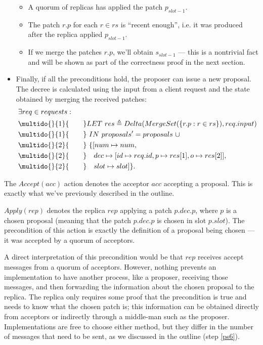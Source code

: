\documentclass[12pt,a4paper,en]{pracamgr}
\newcommand{\ind}[1]{\multido{}{#1}{\qquad}}
\begin{document}
\begin{itemize}
\begin{itemize}
            \item A quorum of replicas has applied the patch $p_{slot - 1}$.
            \item The patch $r.p$ for each $r \in rs$ is ``recent enough'', i.e. it was produced after the replica applied $p_{slot - 1}$.
            \item If we merge the patches $r.p$, we'll obtain $s_{slot - 1}$ --- this is a nontrivial fact and will be shown as part of the correctness proof in the next section.
        \end{itemize}
    \item Finally, if all the preconditions hold, the proposer can issue a new proposal. The decree is calculated using the input from a client request and the state obtained by merging the received patches:
        \begin{align*}
            & \exists req \in requests:\\
            & \ind{1} LET\ res \triangleq Delta(MergeSet(\{r.p: r \in rs\}), req.input)\\
            & \ind{1} \ IN\ proposals' = proposals\ \cup\\
            & \ind{2} \ \{[num \mapsto num,\\
            & \ind{2} \ \ \ dec \mapsto [id \mapsto req.id, p \mapsto res[1], o \mapsto res[2]],\\
            & \ind{2} \ \ \ slot \mapsto slot]\}.
        \end{align*}
\end{itemize}

The $Accept(acc)$ action denotes the acceptor $acc$ accepting a proposal. This is exactly what we've previously described in the outline.

$Apply(rep)$ denotes the replica $rep$ applying a patch $p.dec.p$, where $p$ is a chosen proposal (meaning that the patch $p.dec.p$ is chosen in slot $p.slot$). The precondition of this action is exactly the definition of a proposal being chosen --- it was accepted by a quorum of acceptors.

A direct interpretation of this precondition would be that $rep$ receives accept messages from a quorum of acceptors. However, nothing prevents an implementation to have another process, like a proposer, receiving those messages, and then forwarding the information about the chosen proposal to the replica. The replica only requires some proof that the precondition is true and needs to know what the chosen patch is; this information can be obtained directly from acceptors or indirectly through a middle-man such as the proposer. Implementations are free to choose either method, but they differ in the number of messages that need to be sent, as we discussed in the outline (step \ref{ps6}).
\end{document}

